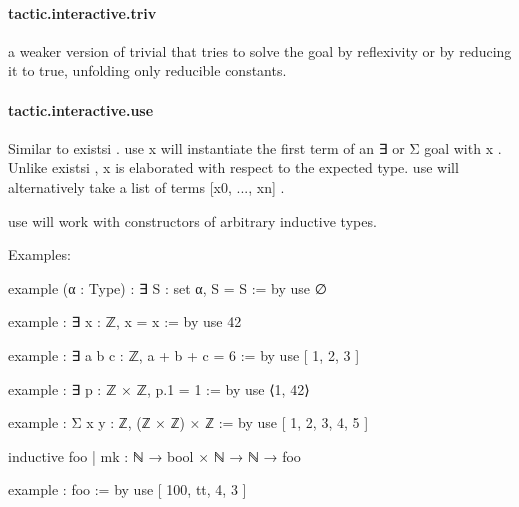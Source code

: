 \documentclass{article}
\begin{document}
\paragraph{tactic.interactive.triv}
\par
a weaker version of 
\colorbox[RGB]{253,246,227}{{{{\color[RGB]{101, 123, 131} trivial }}}} that tries to solve the goal by reflexivity or by reducing it to true,
unfolding only 
\colorbox[RGB]{253,246,227}{{{{\color[RGB]{101, 123, 131} reducible }}}} constants.
\paragraph{tactic.interactive.use}
\par
Similar to 
\colorbox[RGB]{253,246,227}{{{{\color[RGB]{101, 123, 131} existsi }}}}. 
\colorbox[RGB]{253,246,227}{{{{\color[RGB]{101, 123, 131} use x }}}} will instantiate the first term of an 
\colorbox[RGB]{253,246,227}{{{{\color[RGB]{101, 123, 131} ∃ }}}} or 
\colorbox[RGB]{253,246,227}{{{{\color[RGB]{101, 123, 131} Σ }}}} goal with 
\colorbox[RGB]{253,246,227}{{{{\color[RGB]{101, 123, 131} x }}}}.
Unlike 
\colorbox[RGB]{253,246,227}{{{{\color[RGB]{101, 123, 131} existsi }}}}, 
\colorbox[RGB]{253,246,227}{{{{\color[RGB]{101, 123, 131} x }}}} is elaborated with respect to the expected type.
\colorbox[RGB]{253,246,227}{{{{\color[RGB]{101, 123, 131} use }}}} will alternatively take a list of terms 
\colorbox[RGB]{253,246,227}{{{{\color[RGB]{101, 123, 131} {[}x0, ..., xn{]} }}}}.
\par
\colorbox[RGB]{253,246,227}{{{{\color[RGB]{101, 123, 131} use }}}} will work with constructors of arbitrary inductive types.
\par
Examples:
\par
example (α : Type) : ∃ S : set α, S = S :=
by use ∅
\par
example : ∃ x : ℤ, x = x :=
by use 42
\par
example : ∃ a b c : ℤ, a + b + c = 6 :=
by use 
{[}
1, 2, 3
{]}
\par
example : ∃ p : ℤ × ℤ, p.1 = 1 :=
by use ⟨1, 42⟩
\par
example : Σ x y : ℤ, (ℤ × ℤ) × ℤ :=
by use 
{[}
1, 2, 3, 4, 5
{]}
\par
inductive foo
| mk : ℕ → bool × ℕ → ℕ → foo
\par
example : foo :=
by use 
{[}
100, tt, 4, 3
{]}
\end{document}
